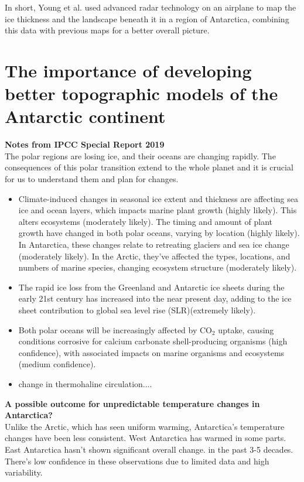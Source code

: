 In short, Young et al. used advanced radar technology on an airplane to map the ice thickness and the landscape beneath it in a region of Antarctica, combining this data with previous maps for a better overall picture.

\chapter{The importance of developing better topographic models of the Antarctic continent}\label{n2}

\textbf{Notes from IPCC Special Report 2019}\\
The polar regions are losing ice, and their oceans are changing rapidly. The consequences of this polar transition extend to the whole planet and it is crucial for us to understand them and plan for changes.
\begin{itemize}
\item Climate-induced changes in seasonal ice extent and thickness are affecting sea ice and ocean layers, which impacts marine plant growth (highly likely). This alters ecosystems (moderately likely). The timing and amount of plant growth have changed in both polar oceans, varying by location (highly likely). In Antarctica, these changes relate to retreating glaciers and sea ice change (moderately likely). In the Arctic, they've affected the types, locations, and numbers of marine species, changing ecosystem structure (moderately likely)\cite{O_C_in_changingClimate}.
\item The rapid ice loss from the Greenland and Antarctic ice sheets during the early 21st century has increased into the near present day, adding to the ice sheet contribution to global sea level rise (SLR)(extremely likely)\cite{O_C_in_changingClimate}.
\item Both polar oceans will be increasingly affected by $\mathrm{CO_2}$ uptake, causing conditions corrosive for calcium carbonate shell-producing organisms (high confidence), with associated impacts on marine organisms and ecosystems (medium confidence)\cite{O_C_in_changingClimate}.
\item change in thermohaline circulation....
\end{itemize}

\textbf{A possible outcome for unpredictable temperature changes in Antarctica?}\\
Unlike the Arctic, which has seen uniform warming, Antarctica's temperature changes have been less consistent. West Antarctica has warmed in some parts. East Antarctica hasn't shown significant overall change. in the past 3-5 decades. There's low confidence in these observations due to limited data and high variability.

